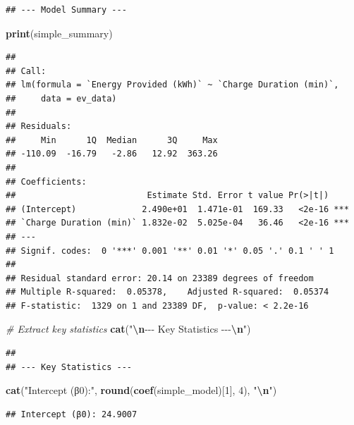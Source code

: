\documentclass[
  12pt,
]{article}
\newenvironment{Shaded}{\begin{snugshade}}{\end{snugshade}}
\newcommand{\CommentTok}[1]{\textcolor[rgb]{0.56,0.35,0.01}{\textit{#1}}}
\newcommand{\DecValTok}[1]{\textcolor[rgb]{0.00,0.00,0.81}{#1}}
\newcommand{\FunctionTok}[1]{\textcolor[rgb]{0.13,0.29,0.53}{\textbf{#1}}}
\newcommand{\NormalTok}[1]{#1}
\newcommand{\SpecialCharTok}[1]{\textcolor[rgb]{0.81,0.36,0.00}{\textbf{#1}}}
\newcommand{\StringTok}[1]{\textcolor[rgb]{0.31,0.60,0.02}{#1}}
\begin{document}
\begin{verbatim}
## --- Model Summary ---
\end{verbatim}

\begin{Shaded}
\begin{Highlighting}[]
\FunctionTok{print}\NormalTok{(simple\_summary)}
\end{Highlighting}
\end{Shaded}

\begin{verbatim}
## 
## Call:
## lm(formula = `Energy Provided (kWh)` ~ `Charge Duration (min)`, 
##     data = ev_data)
## 
## Residuals:
##     Min      1Q  Median      3Q     Max 
## -110.09  -16.79   -2.86   12.92  363.26 
## 
## Coefficients:
##                          Estimate Std. Error t value Pr(>|t|)    
## (Intercept)             2.490e+01  1.471e-01  169.33   <2e-16 ***
## `Charge Duration (min)` 1.832e-02  5.025e-04   36.46   <2e-16 ***
## ---
## Signif. codes:  0 '***' 0.001 '**' 0.01 '*' 0.05 '.' 0.1 ' ' 1
## 
## Residual standard error: 20.14 on 23389 degrees of freedom
## Multiple R-squared:  0.05378,    Adjusted R-squared:  0.05374 
## F-statistic:  1329 on 1 and 23389 DF,  p-value: < 2.2e-16
\end{verbatim}

\begin{Shaded}
\begin{Highlighting}[]
\CommentTok{\# Extract key statistics}
\FunctionTok{cat}\NormalTok{(}\StringTok{"}\SpecialCharTok{\textbackslash{}n}\StringTok{{-}{-}{-} Key Statistics {-}{-}{-}}\SpecialCharTok{\textbackslash{}n}\StringTok{"}\NormalTok{)}
\end{Highlighting}
\end{Shaded}

\begin{verbatim}
## 
## --- Key Statistics ---
\end{verbatim}

\begin{Shaded}
\begin{Highlighting}[]
\FunctionTok{cat}\NormalTok{(}\StringTok{"Intercept (β0):"}\NormalTok{, }\FunctionTok{round}\NormalTok{(}\FunctionTok{coef}\NormalTok{(simple\_model)[}\DecValTok{1}\NormalTok{], }\DecValTok{4}\NormalTok{), }\StringTok{"}\SpecialCharTok{\textbackslash{}n}\StringTok{"}\NormalTok{)}
\end{Highlighting}
\end{Shaded}

\begin{verbatim}
## Intercept (β0): 24.9007
\end{verbatim}
\end{document}

